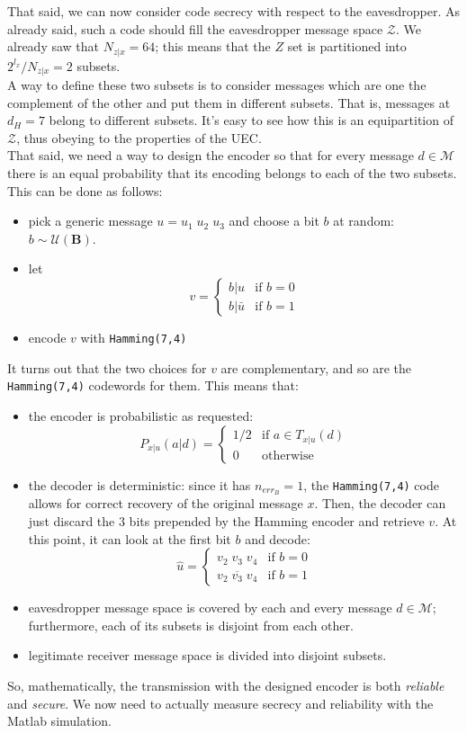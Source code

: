 \documentclass[a4paper,12pt,titlepage]{article}
\begin{document}
That said, we can now consider code secrecy with respect to the eavesdropper.
As already said, such a code should fill the eavesdropper message space
$\mathcal{Z}$. We already saw that $N_{z|x} = 64$; this means that the $Z$ set
is partitioned into $2^{l_x}/N_{z|x} = 2$ subsets. \\
A way to define these two subsets is to consider messages which are one the
complement of the other and put them in different subsets. That is, messages at
$d_H = 7$ belong to different subsets. It's easy to see how this is an
equipartition of $\mathcal{Z}$, thus obeying to the properties of the UEC. \\
That said, we need a way to design the encoder so that for every message $d \in
\mathcal{M}$ there is an equal probability that its encoding belongs to each of
the two subsets. This can be done as follows:
\begin{itemize}
  \item pick a generic message $u = u_1 \; u_2 \; u_3$ and choose a bit $b$ at
  random: $b \sim \mathcal{U}(\mathbf{B})$.
  \item let
  \[
    v = 
    \begin{cases}
      b|u & \text{if } b = 0 \\
      b|\bar{u} & \text{if } b = 1
    \end{cases}
  \]
  \item encode $v$ with \texttt{Hamming(7,4)}
\end{itemize}
It turns out that the two choices for $v$ are complementary, and so are the
\texttt{Hamming(7,4)} codewords for them. This means that:
\begin{itemize}
  \item the encoder is probabilistic as requested:
  \[
    P_{x|u}(a|d) = 
    \begin{cases}
      1/2 & \text{if } a \in T_{x|u}(d) \\
      0   & \text{otherwise}
    \end{cases}
  \]
  \item the decoder is deterministic: since it has $n_{err_B} = 1$, the
  \texttt{Hamming(7,4)} code allows for correct recovery of the original
  message $x$. Then, the decoder can just discard the $3$ bits prepended by the
  Hamming encoder and retrieve $v$. At this point, it can look at the first bit
  $b$ and decode:
  \[
    \hat{u} = 
    \begin{cases}
      v_2 \; v_3 \; v_4 & \text{if } b = 0 \\
      \overline{v_2 \; v_3 \; v_4} & \text{if } b = 1
    \end{cases}
  \]
  \item eavesdropper message space is covered by each and every message $d \in
  \mathcal{M}$; furthermore, each of its subsets is disjoint from each other.
  \item legitimate receiver message space is divided into disjoint subsets.
\end{itemize}
So, mathematically, the transmission with the designed encoder is both
\emph{reliable} and \emph{secure}. We now need to actually measure secrecy and
reliability with the Matlab simulation.
\end{document}
